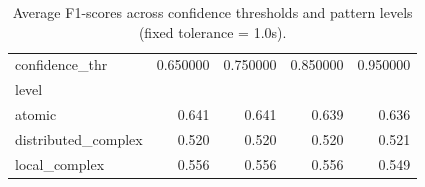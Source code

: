 \begin{table}[H]
\centering
\begin{table}
\caption{Average F1-scores across confidence thresholds and pattern levels (fixed tolerance = 1.0s).}
\label{tab:f1_confidence_summary_t10}
\begin{tabular}{lrrrr}
\toprule
confidence_thr & 0.650000 & 0.750000 & 0.850000 & 0.950000 \\
level &  &  &  &  \\
\midrule
atomic & 0.641 & 0.641 & 0.639 & 0.636 \\
distributed_complex & 0.520 & 0.520 & 0.520 & 0.521 \\
local_complex & 0.556 & 0.556 & 0.556 & 0.549 \\
\bottomrule
\end{tabular}
\end{table}
\end{table}
